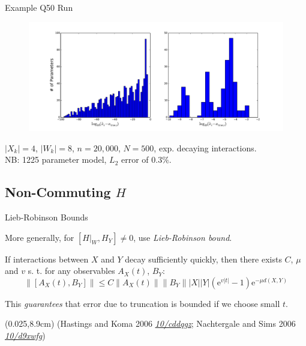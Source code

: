 \documentclass[xcolor=dvipsnames, compress]{beamer}
\renewcommand\UrlFont{\color{red}\rmfamily\itshape}
\newcommand{\shortdoi}[1]{\href{http://doi.org/#1}{\UrlFont 10/#1}}
\newcommand{\ee}{\mathrm{e}}
\newcommand{\bottomnote}[1]{
  \begin{textblock*}{0.95\paperwidth} (0.025\paperwidth,8.9cm)
    {\tiny \hfill #1}
  \end{textblock*}
}
\begin{document}
\begin{frame}{Example Q50 Run}

  \begin{figure}
    \centering
    \includegraphics[width=1\textwidth]{8outc2a-hist}
  \end{figure}

  $|X_k| = 4$, $|W_k| = 8$, $n = 20,000$, $N = 500$, exp. decaying interactions.\\
  NB: 1225 parameter model, $L_2$ error of $0.3\%$.

\end{frame}

\subsection{Non-Commuting $H$}

\begin{frame}{Lieb-Robinson Bounds}

  More generally, for $[H|_W, H_Y] \ne 0$, use \emph{Lieb-Robinson bound}.

  If interactions between $X$ and $Y$ decay sufficiently quickly,
  then there exists $C$, $\mu$ and $v$ s. t. for any observables $A_X(t)$, $B_Y$:
  $$
    \|[A_X(t), B_Y]\| \le C \|A_X(t)\| \|B_Y\| |X| |Y| (\ee^{v|t|} - 1) \ee^{-\mu d(X, Y)}
  $$

  This \emph{guarantees} that error due to truncation is bounded if
  we choose small $t$.

  \bottomnote{(Hastings and Koma 2006 \shortdoi{cddqgz}; Nachtergale and Sims 2006 \shortdoi{d9xwfg})}

\end{frame}
\end{document}
